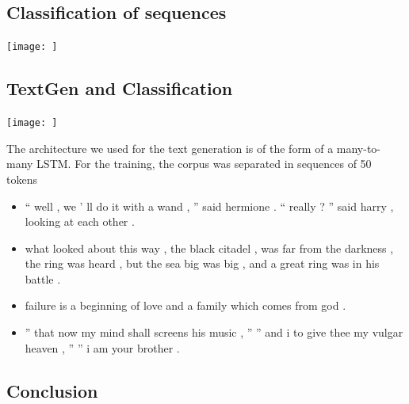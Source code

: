 \documentclass[landscape,a0paper,fontscale=0.285]{baposter} %
\newcommand{\compresslist}{ %
\setlength{\itemsep}{1pt}
\setlength{\parskip}{0pt}
\setlength{\parsep}{0pt}
}
\begin{document}
\begin{poster}
{\begin{multicols}{2}

\begin{center}
\subsection*{Classification of sequences}
\begin{center}
	\texttt{[image: ]}
\end{center}
\end{center}


\begin{center}
\end{center}



\begin{center}
\subsection*{TextGen and Classification}
\end{center}
\begin{center}
	\texttt{[image: ]}
\end{center}
The architecture we used for the text generation is of the form of a many-to-many LSTM. For the training, the corpus was separated in sequences of 50 tokens

\begin{itemize}\compresslist
    \item `` well , we ' ll do it with a wand , '' said hermione . `` really ? '' said harry , looking at each other .
    \item  what looked about this way , the black citadel , was far from the darkness , the ring was heard ,
	but the sea big was big , and a great ring was in his battle .
    \item failure is a beginning of love and a family which comes from god .
    \item  '' that now my mind shall screens his music , '' '' and i to give thee my vulgar heaven , '' '' i am your brother .
 
\end{itemize}


\end{multicols}

\vspace{-1 cm}
\begin{center}
\subsection*{Conclusion}
\end{center}

}
\end{poster}
\end{document}

